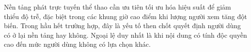 Nền tảng phát trực tuyến thể thao cần ưu tiên tối ưu hóa hiệu suất để giảm thiểu độ trễ, đặc biệt trong các khung giờ cao điểm khi lượng người xem tăng đột biến. Trong hầu hết trường hợp, đây là yếu tố then chốt quyết định người dùng có ở lại nền tảng hay không. Ngoại lệ duy nhất là khi nội dung có tính độc quyền cao đến mức người dùng không có lựa chọn khác.

%
%
%

